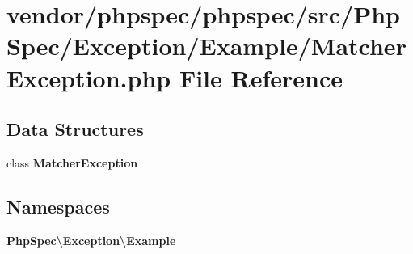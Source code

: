 \section{vendor/phpspec/phpspec/src/\+Php\+Spec/\+Exception/\+Example/\+Matcher\+Exception.php File Reference}
\label{_matcher_exception_8php}
\subsection*{Data Structures}
\begin{DoxyCompactItemize}
\item 
class {\bf Matcher\+Exception}
\end{DoxyCompactItemize}
\subsection*{Namespaces}
\begin{DoxyCompactItemize}
\item 
 {\bf Php\+Spec\textbackslash{}\+Exception\textbackslash{}\+Example}
\end{DoxyCompactItemize}
